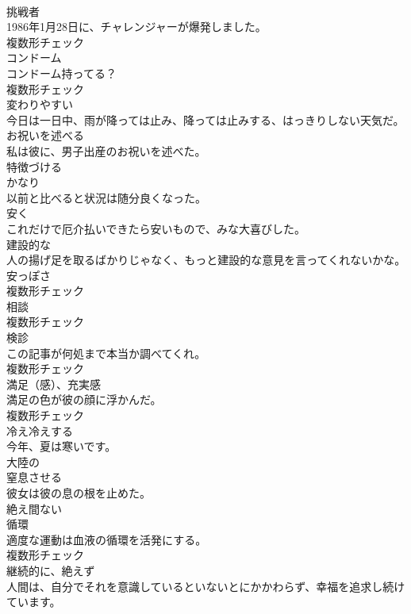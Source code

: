 \documentclass[8pt]{extreport}
\begin{document}
\begin{CJK}{UTF8}{min}
\\	[名詞]	挑戦者	
\\	1986年1月28日に、チャレンジャーが爆発しました。	
\\	複数形チェック
\\	[名詞]	コンドーム	
\\	コンドーム持ってる？	
\\	複数形チェック
\\	[形容詞]	変わりやすい	
\\	今日は一日中、雨が降っては止み、降っては止みする、はっきりしない天気だ。	
\\	[動詞]	お祝いを述べる	
\\	私は彼に、男子出産のお祝いを述べた。	
\\	[動詞]	特徴づける	
\\	[形容詞]	かなり	
\\	以前と比べると状況は随分良くなった。	
\\	[副詞]	安く	
\\	これだけで厄介払いできたら安いもので、みな大喜びした。	
\\	[形容詞]	建設的な	
\\	人の揚げ足を取るばかりじゃなく、もっと建設的な意見を言ってくれないかな。	
\\	[名詞]	安っぽさ	
\\	複数形チェック
\\	[名詞]	相談	
\\	複数形チェック
\\	[名詞]	検診	
\\	この記事が何処まで本当か調べてくれ。	
\\	複数形チェック
\\	[名詞]	満足（感）、充実感	
\\	満足の色が彼の顔に浮かんだ。	
\\	複数形チェック
\\	[形容詞]	冷え冷えする	
\\	今年、夏は寒いです。	
\\	[形容詞]	大陸の	
\\	[動詞]	窒息させる	
\\	彼女は彼の息の根を止めた。	
\\	[形容詞]	絶え間ない	
\\	[名詞]	循環	
\\	適度な運動は血液の循環を活発にする。	
\\	複数形チェック
\\	[副詞]	継続的に、絶えず	
\\	人間は、自分でそれを意識しているといないとにかかわらず、幸福を追求し続けています。	

\end{CJK}
\end{document}
